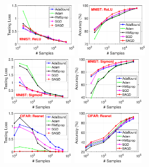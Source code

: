 \documentclass[11pt]{article}
\begin{document}
\begin{figure}[t]
\mbox{
\includegraphics[width=1.45in]{fig2/MNIST_ReLU_loss.eps}
\hspace{-0.15in}
\includegraphics[width=1.45in]{fig2/MNIST_ReLU_acc.eps}
\hspace{-0.15in}
\includegraphics[width=1.45in]{fig2/MNIST_Sigmoid_loss.eps}
\hspace{-0.15in}
\includegraphics[width=1.45in]{fig2/MNIST_Sigmoid_acc.eps}
}
 \mbox{
\includegraphics[width=1.45in]{fig2/CIFAR_Resnet_loss.eps}
\hspace{-0.15in}
\includegraphics[width=1.45in]{fig2/CIFAR_Resnet_acc.eps}
\hspace{-0.15in}
}
\end{figure}
\end{document}
